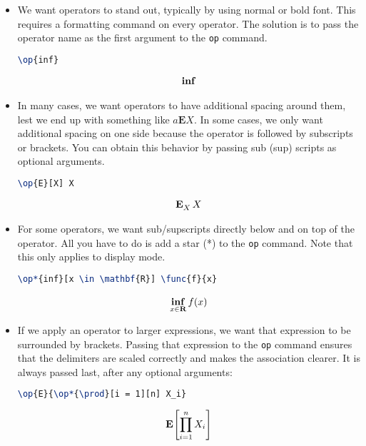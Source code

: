 \documentclass[a4paper,10pt]{scrartcl}
\begin{document}
\begin{itemize}
\item 
We want operators to stand out, typically by using normal or bold font. This requires a formatting command on every operator. The solution is to pass the operator name as the first argument to the \texttt{op} command. 
\begin{lstlisting}[caption=Names, language=TeX]
\op{inf}
\end{lstlisting}
\begin{align} 
  \op{inf} 
\end{align} 
\item 
In many cases, we want operators to have additional spacing around them, lest we end up with something like $a \mathbf{E} X$. In some cases, we only want additional spacing on one side because the operator is followed by subscripts or brackets. You can obtain this behavior by passing sub (sup) scripts as optional arguments.
\begin{lstlisting}[caption=Spacing, language=TeX]
\op{E}[X] X
\end{lstlisting}
\begin{align} 
  \op{E}[X] X
\end{align} 
\item 
For some operators, we want sub/supscripts directly below and on top of the operator. All you have to do is add a star (*) to the \texttt{op} command. Note that this only applies to display mode.
\begin{lstlisting}[caption=Limits, language=TeX]
\op*{inf}[x \in \mathbf{R}] \func{f}{x}
\end{lstlisting}
\begin{align} 
  \op*{inf}[x \in \mathbf{R}] \func{f}{x}
\end{align}
\item
If we apply an operator to larger expressions, we want that expression to be surrounded by brackets. Passing that expression to the \texttt{op} command ensures that the delimiters are scaled correctly and makes the association clearer. It is always passed last, after any optional arguments:
\begin{lstlisting}[caption=Brackets, language=TeX]
\op{E}{\op*{\prod}[i = 1][n] X_i}
\end{lstlisting}
\begin{align} 
\op{E}{\op*{\prod}[i = 1][n] X_i}
\end{align}
\end{itemize}
\end{document}
